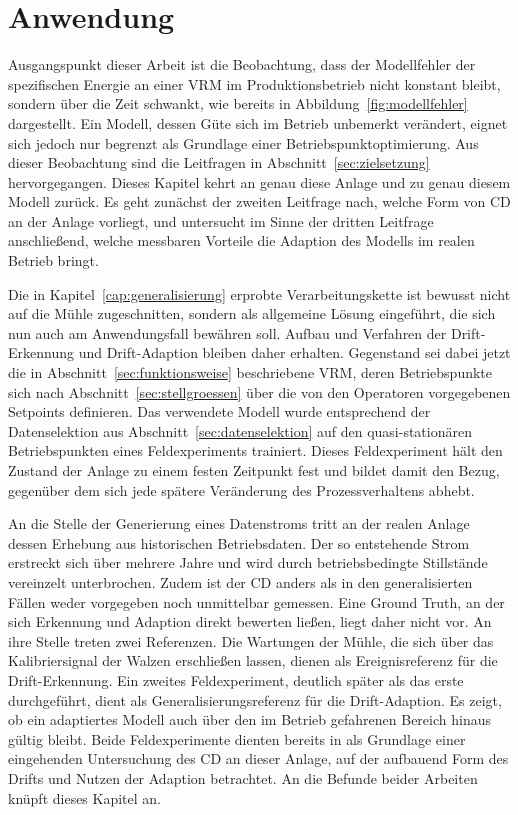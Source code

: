 \chapter{Anwendung} \label{cap:anwendung}
%
Ausgangspunkt dieser Arbeit ist die Beobachtung, dass der Modellfehler der spezifischen Energie an einer \ac{VRM} im Produktionsbetrieb nicht konstant bleibt, sondern über die Zeit schwankt, wie bereits in Abbildung~\ref{fig:modellfehler} dargestellt. Ein Modell, dessen Güte sich im Betrieb unbemerkt verändert, eignet sich jedoch nur begrenzt als Grundlage einer Betriebspunktoptimierung. Aus dieser Beobachtung sind die Leitfragen in Abschnitt~\ref{sec:zielsetzung} hervorgegangen. Dieses Kapitel kehrt an genau diese Anlage und zu genau diesem Modell zurück. Es geht zunächst der zweiten Leitfrage nach, welche Form von \ac{CD} an der Anlage vorliegt, und untersucht im Sinne der dritten Leitfrage anschließend, welche messbaren Vorteile die Adaption des Modells im realen Betrieb bringt. \par
%
Die in Kapitel~\ref{cap:generalisierung} erprobte Verarbeitungskette ist bewusst nicht auf die Mühle zugeschnitten, sondern als allgemeine Lösung eingeführt, die sich nun auch am Anwendungsfall bewähren soll. Aufbau und Verfahren der Drift-Erkennung und Drift-Adaption bleiben daher erhalten. Gegenstand sei dabei jetzt die in Abschnitt~\ref{sec:funktionsweise} beschriebene \ac{VRM}, deren Betriebspunkte sich nach Abschnitt~\ref{sec:stellgroessen} über die von den Operatoren vorgegebenen Setpoints definieren. Das verwendete Modell wurde entsprechend der Datenselektion aus Abschnitt~\ref{sec:datenselektion} auf den quasi-stationären Betriebspunkten eines Feldexperiments trainiert. Dieses Feldexperiment hält den Zustand der Anlage zu einem festen Zeitpunkt fest und bildet damit den Bezug, gegenüber dem sich jede spätere Veränderung des Prozessverhaltens abhebt. \par
%
An die Stelle der Generierung eines Datenstroms tritt an der realen Anlage dessen Erhebung aus historischen Betriebsdaten. Der so entstehende Strom erstreckt sich über mehrere Jahre und wird durch betriebsbedingte Stillstände vereinzelt unterbrochen. Zudem ist der \ac{CD} anders als in den generalisierten Fällen weder vorgegeben noch unmittelbar gemessen. Eine Ground Truth, an der sich Erkennung und Adaption direkt bewerten ließen, liegt daher nicht vor. An ihre Stelle treten zwei Referenzen. Die Wartungen der Mühle, die sich über das Kalibriersignal der Walzen erschließen lassen, dienen als Ereignisreferenz für die Drift-Erkennung. Ein zweites Feldexperiment, deutlich später als das erste durchgeführt, dient als Generalisierungsreferenz für die Drift-Adaption. Es zeigt, ob ein adaptiertes Modell auch über den im Betrieb gefahrenen Bereich hinaus gültig bleibt. Beide Feldexperimente dienten bereits in \cite{igel.2024} als Grundlage einer eingehenden Untersuchung des \ac{CD} an dieser Anlage, auf der aufbauend \cite{marijan.2025} Form des Drifts und Nutzen der Adaption betrachtet. An die Befunde beider Arbeiten knüpft dieses Kapitel an. \par
